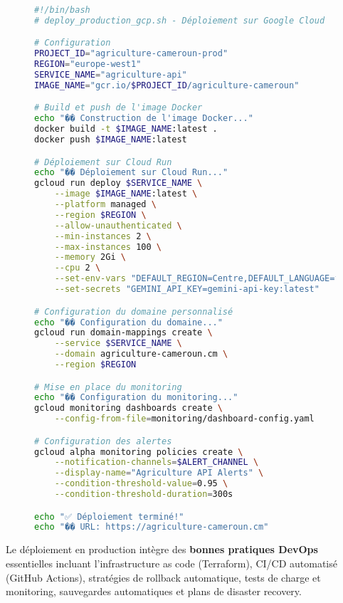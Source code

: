 \begin{figure}[h]
\centering
\begin{lstlisting}[language=bash, caption=Script de déploiement production (GCP)]
#!/bin/bash
# deploy_production_gcp.sh - Déploiement sur Google Cloud

# Configuration
PROJECT_ID="agriculture-cameroun-prod"
REGION="europe-west1"
SERVICE_NAME="agriculture-api"
IMAGE_NAME="gcr.io/$PROJECT_ID/agriculture-cameroun"

# Build et push de l'image Docker
echo "��️ Construction de l'image Docker..."
docker build -t $IMAGE_NAME:latest .
docker push $IMAGE_NAME:latest

# Déploiement sur Cloud Run
echo "�� Déploiement sur Cloud Run..."
gcloud run deploy $SERVICE_NAME \
    --image $IMAGE_NAME:latest \
    --platform managed \
    --region $REGION \
    --allow-unauthenticated \
    --min-instances 2 \
    --max-instances 100 \
    --memory 2Gi \
    --cpu 2 \
    --set-env-vars "DEFAULT_REGION=Centre,DEFAULT_LANGUAGE=fr" \
    --set-secrets "GEMINI_API_KEY=gemini-api-key:latest"

# Configuration du domaine personnalisé
echo "�� Configuration du domaine..."
gcloud run domain-mappings create \
    --service $SERVICE_NAME \
    --domain agriculture-cameroun.cm \
    --region $REGION

# Mise en place du monitoring
echo "�� Configuration du monitoring..."
gcloud monitoring dashboards create \
    --config-from-file=monitoring/dashboard-config.yaml

# Configuration des alertes
gcloud alpha monitoring policies create \
    --notification-channels=$ALERT_CHANNEL \
    --display-name="Agriculture API Alerts" \
    --condition-threshold-value=0.95 \
    --condition-threshold-duration=300s

echo "✅ Déploiement terminé!"
echo "�� URL: https://agriculture-cameroun.cm"
\end{lstlisting}
\end{figure}

Le déploiement en production intègre des \textbf{bonnes pratiques DevOps} essentielles incluant l'infrastructure as code (Terraform), CI/CD automatisé (GitHub Actions), stratégies de rollback automatique, tests de charge et monitoring, sauvegardes automatiques et plans de disaster recovery.

